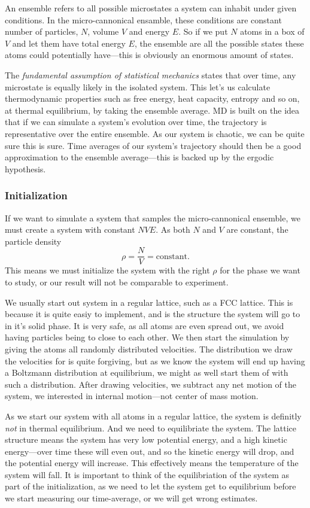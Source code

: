\documentclass[a4paper, 11pt, notitlepage, english]{article}
\begin{document}
An ensemble refers to all possible microstates a system can inhabit under given conditions. In the micro-cannonical ensamble, these conditions are constant number of particles, $N$, volume $V$ and energy $E$. So if we put $N$ atoms in a box of $V$ and let them have total energy $E$, the ensemble are all the possible states these atoms could potentially have---this is obviously an enormous amount of states. 

The \emph{fundamental assumption of statistical mechanics} states that over time, any microstate is equally likely in the isolated system. This let's us calculate thermodynamic properties such as free energy, heat capacity, entropy and so on, at thermal equilibrium, by taking the ensemble average. MD is built on the idea that if we can simulate a system's evolution over time, the trajectory is representative over the entire ensemble. As our system is chaotic, we can be quite sure this is sure. Time averages of our system's trajectory should then be a good approximation to the ensemble average---this is backed up by the ergodic hypothesis.

\subsubsection*{Initialization}

If we want to simulate a system that samples the micro-cannonical ensemble, we must create a system with constant $NVE$. As both $N$ and $V$ are constant, the particle density
$$\rho = \frac{N}{V} = \mbox{constant}.$$
This means we must initialize the system with the right $\rho$ for the phase we want to study, or our result will not be comparable to experiment.

We usually start out system in a regular lattice, such as a FCC lattice. This is because it is quite easiy to implement, and is the structure the system will go to in it's solid phase. It is very safe, as all atoms are even spread out, we avoid having particles being to close to each other. We then start the simulation by giving the atoms all randomly distributed velocities. The distribution we draw the velocities for is quite forgiving, but as we know the system will end up having a Boltzmann distribution at equilibrium, we might as well start them of with such a distribution. After drawing velocities, we subtract any net motion of the system, we interested in internal motion---not center of mass motion.

As we start our system with all atoms in a regular lattice, the system is definitly \emph{not} in thermal equilibrium. And we need to equilibriate the system. The lattice structure means the system has very low potential energy, and a high kinetic energy---over time these will even out, and so the kinetic energy will drop, and the potential energy will increase. This effectively means the temperature of the system will fall. It is important to think of the equilibriation of the system as part of the initialization, as we need to let the system get to equilibrium before we start measuring our time-average, or we will get wrong estimates. 
\end{document}
